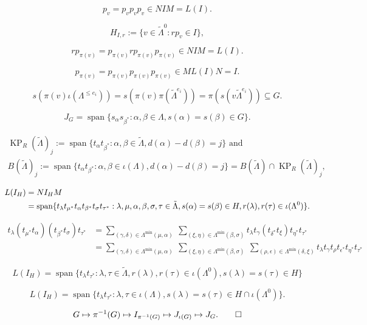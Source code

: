 \documentclass[a4paper,12pt]{article}
\begin{document}
\[
 p_v=p_vp_vp_v \in NIM = L(I).
\]

\[H_{I,r} := \{v \in {\tilde{\Lambda}}^0 : rp_v \in I\},\]

\[rp_{\pi(v)} = p_{\pi(v)}rp_{\pi(v)}p_{\pi(v)} \in NIM = L(I).
\]

\[p_{\pi(v)} = p_{\pi(v)}p_{\pi(v)}p_{\pi(v)}  \in ML(I)N = I.\]

\[
s(\pi(v)\iota(\Lambda^{\leq e_i}))=s(\pi(v)\pi(\tilde\Lambda^{e_i}))=\pi(s(v\tilde\Lambda^{e_i}))\subseteq G.
\]

\begin{equation}J_G={\operatorname{\mathrm{span}}}\{s_\alpha s_{\beta^*}:\alpha,\beta\in\Lambda, s(\alpha)=s(\beta)\in G\}.\label{eq-is-ideal}\end{equation}

\begin{gather*}\operatorname{KP}_R(\tilde\Lambda)_j:= {\operatorname{\mathrm{span}}}\{t_\alpha t_{\beta^{*}}: \alpha,\beta\in{\tilde{\Lambda}}, d(\alpha)-d(\beta)=j\}\text{\ and }\\
B({\tilde{\Lambda}})_j:= {\operatorname{\mathrm{span}}}\{t_\alpha t_{\beta^{*}}: \alpha,\beta\in\iota(\Lambda), d(\alpha)-d(\beta)=j\}=B({\tilde{\Lambda}})\cap \operatorname{KP}_R(\tilde\Lambda)_j,
\end{gather*}

\begin{align}
L(I_H)&=NI_HM\notag\\
&={\operatorname{\mathrm{span}}}\{t_\lambda t_{\mu^*}t_\alpha t_{\beta^{*}}t_\sigma t_{\tau^{*}}: \lambda, \mu, \alpha,\beta, \sigma,\tau\in{\tilde{\Lambda}},s(\alpha)=s(\beta)\in H, r(\lambda),r(\tau)\in\iota(\Lambda^0)\}.\label{eq-mess}
\end{align}

\begin{align*}
t_\lambda (t_{\mu^*}t_\alpha)( t_{\beta^{*}}t_\sigma) t_{\tau^{*}}&=\sum_{(\gamma,\delta)\in\Lambda^{\min}(\mu,\alpha)}
\ \sum_{(\xi,\eta)\in\Lambda^{\min}(\beta,\sigma)} t_\lambda t_\gamma (t_{\delta^*}t_\xi) t_{\eta^*}t_{\tau^{*}}\\
&=\sum_{(\gamma,\delta)\in\Lambda^{\min}(\mu,\alpha)}
\ \sum_{(\xi,\eta)\in\Lambda^{\min}(\beta,\sigma)} \ \sum_{(\rho,\epsilon)\in\Lambda^{\min}(\delta,\xi)}t_\lambda t_\gamma t_{\rho}t_{\epsilon^*} t_{\eta^*}t_{\tau^{*}}
\end{align*}

\[
L(I_H)={\operatorname{\mathrm{span}}}\{t_\lambda t_{\tau^*}:\lambda,\tau\in{\tilde{\Lambda}}, r(\lambda),r(\tau)\in\iota(\Lambda^0), s(\lambda)=s(\tau)\in H\}
\]

\[
L(I_H)={\operatorname{\mathrm{span}}}\{t_\lambda t_{\tau^*}:\lambda,\tau\in\iota(\Lambda), s(\lambda)=s(\tau)\in H\cap \iota(\Lambda^0)\}.
\]

\[
 G\mapsto \pi^{-1}(G)\mapsto I_{\pi^{-1}(G)}\mapsto J_{\iota(G)}\mapsto J_G.\qedhere
 \]
\end{document}
